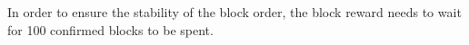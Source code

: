 \documentclass[a4paper,11pt]{article}
\begin{document}
In order to ensure the stability of the block order, the block reward needs to wait for 100 confirmed blocks to be spent.







\clearpage



%
%


\end{document}

